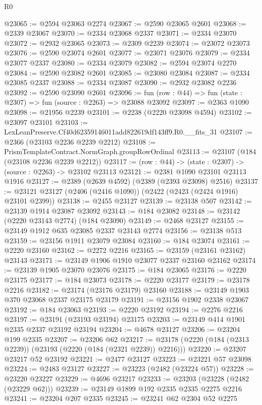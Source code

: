 \begin{lexlean}{R0}
\begin{coremodule}
@23065 := @2594 @23063 @2274
@23067 := @2590 @23065 @2601
@23068 := @2339 @23067
@23070 := @2334 @23068 @2337
@23071 := @2334 @23070
@23072 := @2932 @23065
@23073 := @2309 @2239
@23074 := @23072 @23073
@23076 := @2590 @23074 @2601
@23077 := @23071 @23076
@23079 := @2334 @23077 @2337
@23080 := @2334 @23079
@23082 := @2594 @23074 @2270
@23084 := @2590 @23082 @2601
@23085 := @23080 @23084
@23087 := @2334 @23085 @2337
@23088 := @2334 @23087
@23090 := @2932 @23082 @2236
@23092 := @2590 @23090 @2601
@23096 := fun (row : @44) => fun (state : @2307) => fun (source : @2263) => @23088 @23092
@23097 := @2363 @1090
@23098 := @21956 @2239
@23101 := @2238 (@2220 @23098 @4594)
@23102 := @23097 @23101
@23103 := LexLeanPreserve.Cf40d62359146011add822619df143ff9.R0.__fits_31
@23107 := @2366 (@23103 @2236 @2239 @2212)
@23108 := PrismTemplateContract.NormGraph.groupRowOrdinal
@23113 := @23107 (@184 (@23108 @2236 @2239 @2212))
@23117 := (row : @44) -> (state : @2307) -> (source : @2263) -> @23102 @23113
@23121 := @2381 @1090 @23101 @23113 @1916
@23127 := @2389 (@2639 @4592) (@2389 (@2393 @23098) @2516)
@23137 := @23121 @23127 (@2406 (@2416 @1090)) (@2422 (@2423 (@2424 @1916) @23101 @2399))
@23138 := @2455 @23127
@23139 := @23138 @507
@23142 := @23139 @1914 @23087 @23092
@23143 := @184 @23082
@23148 := @23142 (@2220 @23143 @2774) (@184 @23090)
@23149 := @2468 @23127
@23155 := @23149 @1912 @635 @23085 @2337 @23143 @2774
@23156 := @23138 @513
@23159 := @23156 @1911 @23079 @23084
@23160 := @184 @23074
@23161 := @2220 @23160
@23162 := @2272 @2216
@23165 := @23159 (@23161 @23162) @23143
@23171 := @23149 @1906 @1910 @23077 @2337 @23160 @23162
@23174 := @23139 @1905 @23070 @23076
@23175 := @184 @23065
@23176 := @2220 @23175
@23177 := @184 @23073
@23178 := @2220 @23177
@23179 := @23178 @2216
@23182 := @23174 (@23176 @23179) @23160
@23188 := @23149 @1903 @370 @23068 @2337 @23175 @23179
@23191 := @23156 @1902 @2338 @23067
@23192 := @184 @23063
@23193 := @2220 @23192
@23194 := @2276 @2216
@23197 := @23191 (@23193 @23194) @23175
@23203 := @23149 @414 @1901 @2335 @2337 @23192 @23194
@23204 := @4678 @23127
@23206 := @23204 @199 @2335
@23207 := @23206 @62
@23217 := @23178 (@2220 (@184 (@2313 @2239)) (@23193 (@2220 (@184 (@2321 @2239)) @2216)))
@23220 := @23207 @23217 @52 @23192
@23221 := @2477 @23127
@23223 := @23221 @57 @23098
@23224 := @2483 @23127
@23227 := @23223 (@2482 (@23224 @57))
@23228 := @23220 @23227
@23229 := @4696 @23217
@23233 := @23203 (@23228 (@2482 (@23229 @62)))
@23239 := @23149 @1899 @192 @2335 @2335 @2275 @2216
@23241 := @23204 @207 @2335
@23245 := @23241 @62 @2304 @52 @2275

\end{coremodule}
\end{lexlean}
